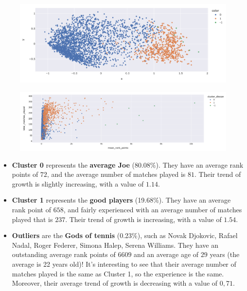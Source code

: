 \begin{figure}[h]
	\centering
	\begin{minipage}{.43\textwidth}
		\centering
		\includegraphics[width=\textwidth]{plots/dbscan/dbscan_pca.png}
		\label{fig:dbscan_pca}
	\end{minipage}%
	\begin{minipage}{.57\textwidth}
		\centering
		\includegraphics[width=\textwidth]{plots/dbscan/dbscan_scatter.png}
		\label{fig:dbscan_scatter}
	\end{minipage}
\end{figure}
\begin{itemize}
    \item \textbf{Cluster 0} represents the \textbf{average Joe} (80.08\%). They have an average rank points of $72$, and the average number of matches played is $81$. Their trend of growth is slightly increasing, with a value of $1.14$.
    \item \textbf{Cluster 1} represents the \textbf{good players} (19.68\%). They have an average rank point of $658$, and fairly experienced with an average number of matches played that is $237$. Their trend of growth is increasing, with a value of $1.54$.
    \item \textbf{Outliers} are the \textbf{Gods of tennis} (0.23\%), such as Novak Djokovic, Rafael Nadal, Roger Federer, Simona Halep, Serena Williams. They have an outstanding average rank points of $6609$ and an average age of $29$ years (the average is 22 years old)! It's interesting to see that their average number of matches played is the same as Cluster 1, so the experience is the same. Moreover, their average trend of growth is decreasing with a value of $0,71$.
\end{itemize}	


